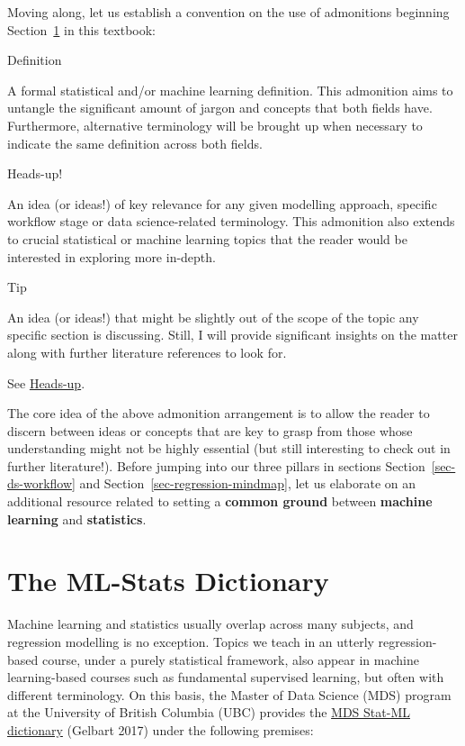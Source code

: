 \documentclass[
  letterpaper,
  DIV=11,
  numbers=noendperiod]{scrreprt}
\begin{document}
Moving along, let us establish a convention on the use of admonitions
beginning Section~\ref{sec-ml-stats-dictionary} in this textbook:

Definition

A formal statistical and/or machine learning definition. This admonition
aims to untangle the significant amount of jargon and concepts that both
fields have. Furthermore, alternative terminology will be brought up
when necessary to indicate the same definition across both fields.

\label{headsup1}
Heads-up!

An idea (or ideas!) of key relevance for any given modelling approach,
specific workflow stage or data science-related terminology. This
admonition also extends to crucial statistical or machine learning
topics that the reader would be interested in exploring more in-depth.

Tip

An idea (or ideas!) that might be slightly out of the scope of the topic
any specific section is discussing. Still, I will provide significant
insights on the matter along with further literature references to look
for.

See \hyperref[headsup1]{Heads-up}.

The core idea of the above admonition arrangement is to allow the reader
to discern between ideas or concepts that are key to grasp from those
whose understanding might not be highly essential (but still interesting
to check out in further literature!). Before jumping into our three
pillars in sections Section~\ref{sec-ds-workflow} and
Section~\ref{sec-regression-mindmap}, let us elaborate on an additional
resource related to setting a \textbf{common ground} between
\textbf{machine learning} and \textbf{statistics}.

\section{The ML-Stats Dictionary}\label{sec-ml-stats-dictionary}

Machine learning and statistics usually overlap across many subjects,
and regression modelling is no exception. Topics we teach in an utterly
regression-based course, under a purely statistical framework, also
appear in machine learning-based courses such as fundamental supervised
learning, but often with different terminology. On this basis, the
Master of Data Science (MDS) program at the University of British
Columbia (UBC) provides the
\href{https://ubc-mds.github.io/resources_pages/terminology/}{MDS
Stat-ML dictionary} (Gelbart 2017) under the following premises:
\end{document}
